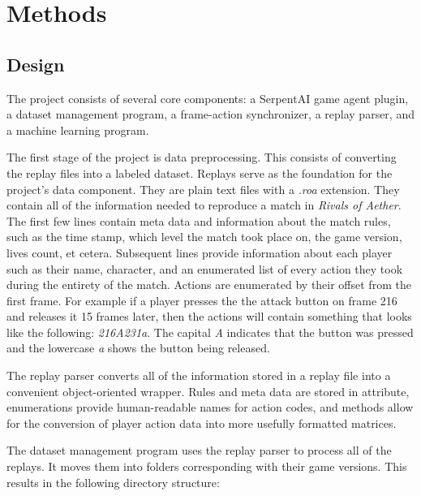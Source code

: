 \chapter{Methods}


\section{Design}

The project consists of several core components: a SerpentAI game agent plugin, a dataset management program, a frame-action synchronizer, a replay parser, and a machine learning program.

The first stage of the project is data preprocessing. This consists of converting the replay files into a labeled dataset. Replays serve as the foundation for the project's data component. They are plain text files with a \textit{.roa} extension. They contain all of the information needed to reproduce a match in \textit{Rivals of Aether}. The first few lines contain meta data and information about the match rules, such as the time stamp, which level the match took place on, the game version, lives count, et cetera. Subsequent lines provide information about each player such as their name, character, and an enumerated list of every action they took during the entirety of the match. Actions are enumerated by their offset from the first frame. For example if a player presses the the attack button on frame 216 and releases it 15 frames later, then the actions will contain something that looks like the following: \textit{216A231a}. The capital \textit{A} indicates that the button was pressed and the lowercase \textit{a} shows the button being released.

The replay parser converts all of the information stored in a replay file into a convenient object-oriented wrapper. Rules and meta data are stored in attribute, enumerations provide human-readable names for action codes, and methods allow for the conversion of player action data into more usefully formatted matrices.

The dataset management program uses the replay parser to process all of the replays. It moves them into folders corresponding with their game versions. This results in the following directory structure:

